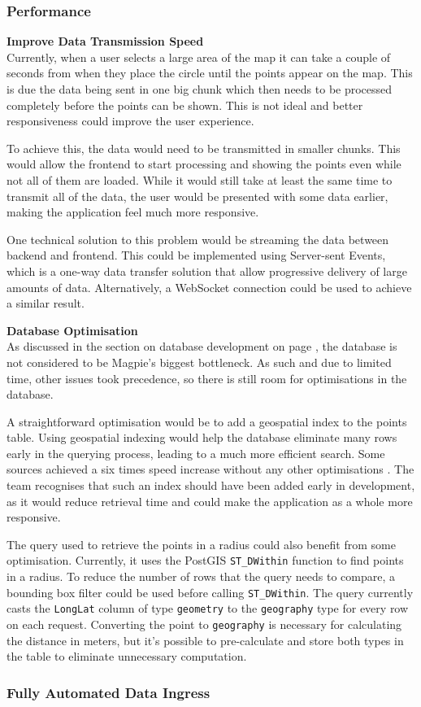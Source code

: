 \subsubsection{Performance}
\textbf{Improve Data Transmission Speed}\\
Currently, when a user selects a large area of the map it can take a couple of
seconds from when they place the circle until the points appear on the map. This
is due the data being sent in one big chunk which then needs to be processed
completely before the points can be shown. This is not ideal and better
responsiveness could improve the user experience.

To achieve this, the data would need to be transmitted in smaller chunks. This
would allow the frontend to start processing and showing the points even while
not all of them are loaded. While it would still take at least the same time to
transmit all of the data, the user would be presented with some data earlier,
making the application feel much more responsive.

One technical solution to this problem would be streaming the data between
backend and frontend. This could be implemented using Server{-}sent Events,
which is a one{-}way data transfer solution that allow progressive delivery of
large amounts of data. Alternatively, a WebSocket connection could be used to
achieve a similar result.

\textbf{Database Optimisation}\\
As discussed in the section on database development on page
\pageref{database_development}, the database is not considered to be Magpie's
biggest bottleneck. As such and due to limited time, other issues took
precedence, so there is still room for optimisations in the database.

A straightforward optimisation would be to add a geospatial index to the points
table. Using geospatial indexing would help the database eliminate many rows
early in the querying process, leading to a much more efficient search. Some
sources achieved a six times speed increase without any other optimisations
\cite{postgis_indexing}. The team recognises that such an index should have been
added early in development, as it would reduce retrieval time and could make the
application as a whole more responsive.

The query used to retrieve the points in a radius could also benefit from some
optimisation. Currently, it uses the PostGIS \texttt{ST\_DWithin} function to
find points in a radius. To reduce the number of rows that the query needs to
compare, a bounding box filter could be used before calling
\texttt{ST\_DWithin}. The query currently casts the \texttt{LongLat} column of
type \texttt{geometry} to the \texttt{geography} type for every row on each
request. Converting the point to \texttt{geography} is necessary for calculating
the distance in meters, but it's possible to pre{-}calculate and store both
types in the table to eliminate unnecessary computation.

\subsubsection{Fully Automated Data Ingress}
